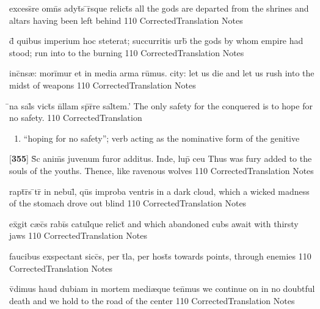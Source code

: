 \latline
  {excess\={}re omn\={}s adyt\={\macron {\i}}s \={}r\={\macron {\i}}sque relict\={\macron {\i}}s}
  { all the gods are departed from the shrines and altars having been left behind }
  {110}
  { CorrectedTranslation }
  { Notes }


\latline
  {d\={\macron {\i}} quibus imperium hoc steterat; succurritis urb\={\macron {\i}}}
  { the gods by whom empire had stood;  run into to the burning  }
  {110}
  { CorrectedTranslation }
  { Notes }


\latline
  {inc\={}ns{\ae}: mori\={}mur et in media arma ru\={}mus.}
  { city: let us die and let us rush into the midst of weapons }
  {110}
  { CorrectedTranslation }
  { Notes }


\latline
  {\={}na sal\={}s vict\={\macron {\i}}s n\={}llam sp\={}r\={}re sal\={}tem.'}
  { The only safety for the conquered is to hope for no safety. }
  {110}
  { CorrectedTranslation }
  { \begin{enumerate}
  	\item ``hoping for no safety''; verb acting as the nominative form of the genitive
  \end{enumerate} }


\latline
  {[\textbf{355}] S\={\macron {\i}}c anim\={\macron {\i}}s juvenum furor additus.  Inde, lup\={\macron {\i}} ceu}
  { Thus was fury added to the souls of the youths.  Thence, like ravenous wolves }
  {110}
  { CorrectedTranslation }
  { Notes }


\latline
  {rapt\={}r\={}s \={}tr\={} in nebul\={}, qu\={}s improba ventris}
  { in a dark cloud, which a wicked madness of the stomach drove out blind}
  {110}
  { CorrectedTranslation }
  { Notes }


\latline
  {ex\={}git c{\ae}c\={}s rabi\={}s catul\={\macron {\i}}que relict\={\macron {\i}}}
  { and which abandoned cubs await with thirsty jaws }
  {110}
  { CorrectedTranslation }
  { Notes }


\latline
  {faucibus exspectant sicc\={\macron {\i}}s, per t\={}la, per host\={\macron {\i}}s}
  { towards points, through enemies }
  {110}
  { CorrectedTranslation }
  { Notes }


\latline
  {v\={}dimus haud dubiam in mortem medi{\ae}que ten\={}mus}
  { we continue on in no doubtful death and we hold to the road of the center }
  {110}
  { CorrectedTranslation }
  { Notes }


